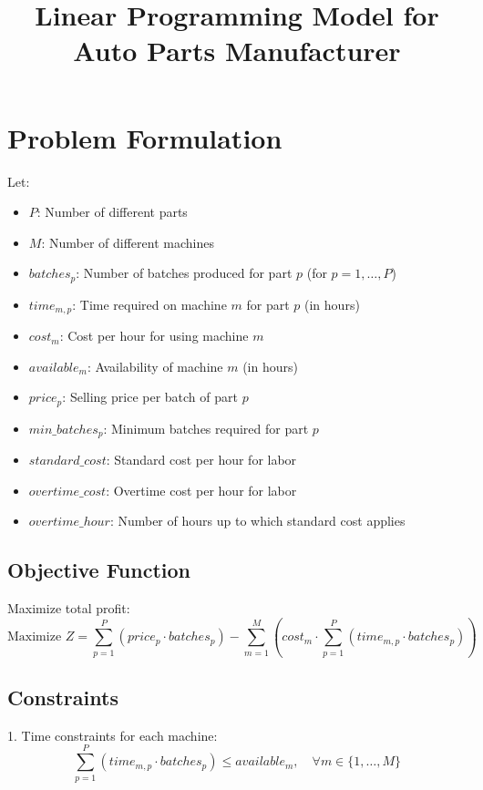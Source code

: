 \documentclass{article}
\begin{document}
\title{Linear Programming Model for Auto Parts Manufacturer}
\author{}
\date{}
\maketitle

\section*{Problem Formulation}

Let:
\begin{itemize}
    \item \( P \): Number of different parts
    \item \( M \): Number of different machines
    \item \( batches_{p} \): Number of batches produced for part \( p \) (for \( p = 1, \ldots, P \))
    \item \( time_{m,p} \): Time required on machine \( m \) for part \( p \) (in hours)
    \item \( cost_{m} \): Cost per hour for using machine \( m \)
    \item \( available_{m} \): Availability of machine \( m \) (in hours)
    \item \( price_{p} \): Selling price per batch of part \( p \)
    \item \( min\_batches_{p} \): Minimum batches required for part \( p \)
    \item \( standard\_cost \): Standard cost per hour for labor
    \item \( overtime\_cost \): Overtime cost per hour for labor
    \item \( overtime\_hour \): Number of hours up to which standard cost applies
\end{itemize}

\subsection*{Objective Function}
Maximize total profit:
\[
\text{Maximize } Z = \sum_{p=1}^{P} (price_{p} \cdot batches_{p}) - \sum_{m=1}^{M} (cost_{m} \cdot \sum_{p=1}^{P} (time_{m,p} \cdot batches_{p}))
\]

\subsection*{Constraints}
1. Time constraints for each machine:
\[
\sum_{p=1}^{P} (time_{m,p} \cdot batches_{p}) \leq available_{m}, \quad \forall m \in \{1, \ldots, M\}
\]
\end{document}
